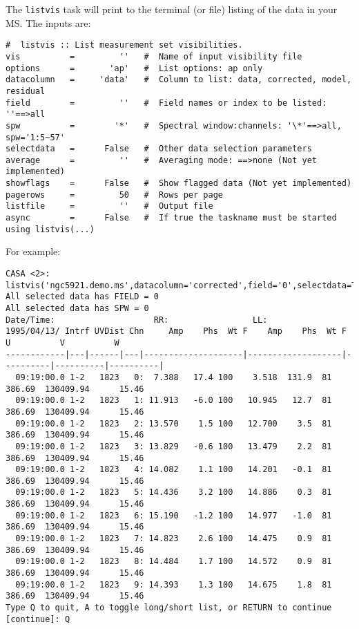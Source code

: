 The {\tt listvis} task will print to the terminal (or file) listing
of the data in your MS.
The inputs are:
\small
\begin{verbatim}
#  listvis :: List measurement set visibilities.
vis          =         ''   #  Name of input visibility file
options      =       'ap'   #  List options: ap only
datacolumn   =     'data'   #  Column to list: data, corrected, model, residual
field        =         ''   #  Field names or index to be listed: ''==>all
spw          =        '*'   #  Spectral window:channels: '\*'==>all, spw='1:5~57'
selectdata   =      False   #  Other data selection parameters
average      =         ''   #  Averaging mode: ==>none (Not yet implemented)
showflags    =      False   #  Show flagged data (Not yet implemented)
pagerows     =         50   #  Rows per page
listfile     =         ''   #  Output file
async        =      False   #  If true the taskname must be started using listvis(...)
\end{verbatim}
\normalsize

For example:
\small
\begin{verbatim}
CASA <2>: listvis('ngc5921.demo.ms',datacolumn='corrected',field='0',selectdata=T,antenna='*&*',pagerows=10)
All selected data has FIELD = 0
All selected data has SPW = 0
Date/Time:                    RR:                 LL:                                                
1995/04/13/ Intrf UVDist Chn     Amp    Phs  Wt F    Amp    Phs  Wt F          U          V          W
------------|---|------|---|--------------------|-------------------|----------|----------|----------|
  09:19:00.0 1-2   1823   0:  7.388   17.4 100    3.518  131.9  81       386.69  130409.94      15.46
  09:19:00.0 1-2   1823   1: 11.913   -6.0 100   10.945   12.7  81       386.69  130409.94      15.46
  09:19:00.0 1-2   1823   2: 13.570    1.5 100   12.700    3.5  81       386.69  130409.94      15.46
  09:19:00.0 1-2   1823   3: 13.829   -0.6 100   13.479    2.2  81       386.69  130409.94      15.46
  09:19:00.0 1-2   1823   4: 14.082    1.1 100   14.201   -0.1  81       386.69  130409.94      15.46
  09:19:00.0 1-2   1823   5: 14.436    3.2 100   14.886    0.3  81       386.69  130409.94      15.46
  09:19:00.0 1-2   1823   6: 15.190   -1.2 100   14.977   -1.0  81       386.69  130409.94      15.46
  09:19:00.0 1-2   1823   7: 14.823    2.6 100   14.475    0.9  81       386.69  130409.94      15.46
  09:19:00.0 1-2   1823   8: 14.484    1.7 100   14.572    0.9  81       386.69  130409.94      15.46
  09:19:00.0 1-2   1823   9: 14.393    1.3 100   14.675    1.8  81       386.69  130409.94      15.46
Type Q to quit, A to toggle long/short list, or RETURN to continue [continue]: Q

\end{verbatim}
\normalsize

